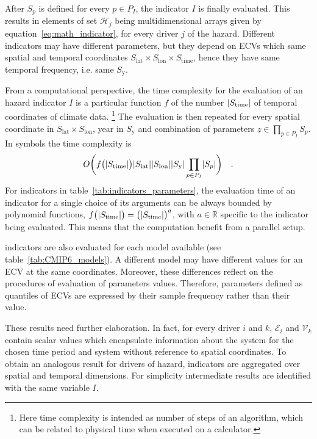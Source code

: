 After $S_p$ is defined for every $p \in P_I$, the \gls{indicator} $I$ is finally evaluated. This results in elements of set $\mathcal{H}_j$ being multidimensional arrays given by equation~\eqref{eq:math_indicator}, for every \gls{driver} $j$ of the \gls{hazard}. Different \glspl{indicator} may have different parameters, but they depend on \glspl{ECV} which same spatial and temporal coordinates $S_\text{lat} \times S_\text{lon} \times S_\text{time}$, hence they have same temporal frequency, i.e. same $S_\text{y}$.

From a computational perspective, the time complexity for the evaluation of an \gls{hazard} \gls{indicator} $I$ is a particular function $f$ of the number $\lvert S_\text{time}\rvert$ of temporal coordinates of climate data.%
\footnote{Here time complexity is intended as number of steps of an algorithm, which can be related to physical time when executed on a calculator.}
The evaluation is then repeated for every spatial coordinate in $S_\text{lat} \times S_\text{lon}$, year in $S_\text{y}$ and combination of parameters $\underline{z} \in \prod_{p \in P_I} S_p$. In symbols the time complexity is
\begin{equation}
  \label{eq:complexity_parameters}
  O \bigg( f \big( \lvert S_\text{time}\rvert \big) \lvert S_\text{lat}\rvert \lvert S_\text{lon}\rvert \lvert S_\text{y}\rvert \prod_{p \in P_I} \lvert S_p\rvert \bigg)
  \quad .
\end{equation}
For indicators in table~\ref{tab:indicators_parameters}, the evaluation time of an indicator for a single choice of its arguments can be always bounded by polynomial functions, $f \big( \lvert S_\text{time}\rvert \big) = \big( \lvert S_\text{time}\rvert \big)^a $, with $a \in \mathbb{R}$ specific to the indicator being evaluated. This means that the computation benefit from a parallel setup.

\Glspl{indicator} are also evaluated for each model available (see table~\ref{tab:CMIP6_models}). A different model may have different values for an \gls{ECV} at the same coordinates. Moreover, these differences reflect on the procedures of evaluation of parameters values. Therefore, parameters defined as quantiles of \glspl{ECV} are expressed by their sample frequency rather than their value.

These results need further elaboration. In fact, for every \gls{driver} $i$ and $k$, $\mathcal{E}_i$ and $\mathcal{V}_k$ contain scalar values which encapsulate information about the system for the chosen time period and system without reference to spatial coordinates. To obtain an analogous result for \glspl{driver} of \gls{hazard}, \glspl{indicator} are aggregated over spatial and temporal dimensions. For simplicity intermediate results are identified with the same variable $I$.

